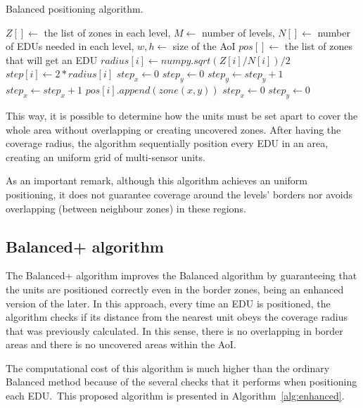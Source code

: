 \begin{refsection}
\begin{algorithm}[ht!]
  \caption{Balanced positioning algorithm.}\label{alg:balanced}
  \begin{algorithmic}
    \REQUIRE $Z[] \gets$ the list of zones in each level, $M \gets$ number of levels, $N[] \gets$ number of EDUs needed in each level, $w, h \gets$ size of the AoI
    \ENSURE $pos[] \gets$ the list of zones that will get an EDU
      \STATE $radius[i] \gets numpy.sqrt(Z[i] / N[i]) / 2$
      \STATE $step[i] \gets 2 * radius[i]$
    \ENDFOR
    \STATE $step_x \gets 0$
    \STATE $step_y \gets 0$
      \STATE $step_y \gets step_y + 1$
        \STATE $step_x \gets step_x + 1$
            \STATE $pos[i].append(zone(x, y))$
            \STATE $step_x \gets 0$
            \STATE $step_y \gets 0$
          \ENDIF
        \ENDFOR
      \ENDFOR
    \ENDFOR
  \end{algorithmic}
\end{algorithm}

This way, it is possible to determine how the units must be set apart to cover the whole area without overlapping or creating uncovered zones. After having the coverage radius, the algorithm sequentially position every EDU in an area, creating an uniform grid of multi-sensor units.

As an important remark, although this algorithm achieves an uniform positioning, it does not guarantee coverage around the levels' borders nor avoids overlapping (between neighbour zones) in these regions.

\subsection {Balanced+ algorithm}

The Balanced+ algorithm improves the Balanced algorithm by guaranteeing that the units are positioned correctly even in the border zones, being an enhanced version of the later. In this approach, every time an EDU is positioned, the algorithm checks if its distance from the nearest unit obeys the coverage radius that was previously calculated. In this sense, there is no overlapping in border areas and there is no uncovered areas within the AoI.

The computational cost of this algorithm is much higher than the ordinary Balanced method because of the several checks that it performs when positioning each EDU.\ This proposed algorithm is presented in Algorithm~\ref{alg:enhanced}.


\end{refsection}
